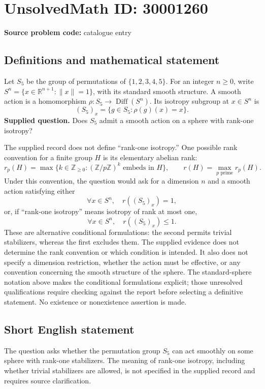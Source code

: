 \documentclass[11pt]{article}
\newcommand{\Z}{\mathbb{Z}}
\newcommand{\R}{\mathbb{R}}
\begin{document}
\section*{UnsolvedMath ID: 30001260}
\textbf{Source problem code:} catalogue entry
\subsection{Definitions and mathematical statement}
Let \(S_5\) be the group of permutations of \(\{1,2,3,4,5\}\). For an integer \(n\geq 0\), write \(S^n=\{x\in\R^{n+1}:\|x\|=1\}\), with its standard smooth structure. A smooth action is a homomorphism \(\rho:S_5\to\operatorname{Diff}(S^n)\). Its isotropy subgroup at \(x\in S^n\) is
\[
(S_5)_x=\{g\in S_5:\rho(g)(x)=x\}.
\]
\textbf{Supplied question.} Does \(S_5\) admit a smooth action on a sphere with rank-one isotropy?

The supplied record does not define ``rank-one isotropy.'' One possible rank convention for a finite group \(H\) is its elementary abelian rank:
\[
r_p(H)=\max\{k\in\Z_{\geq0}:(\Z/p\Z)^k\text{ embeds in }H\},\qquad
r(H)=\max_{p\text{ prime}}r_p(H).
\]
Under this convention, the question would ask for a dimension \(n\) and a smooth action satisfying either
\[
\forall x\in S^n,\quad r((S_5)_x)=1,
\]
or, if ``rank-one isotropy'' means isotropy of rank at most one,
\[
\forall x\in S^n,\quad r((S_5)_x)\leq1.
\]
These are alternative conditional formulations: the second permits trivial stabilizers, whereas the first excludes them. The supplied evidence does not determine the rank convention or which condition is intended. It also does not specify a dimension restriction, whether the action must be effective, or any convention concerning the smooth structure of the sphere. The standard-sphere notation above makes the conditional formulations explicit; those unresolved qualifications require checking against the report before selecting a definitive statement. No existence or nonexistence assertion is made.
\subsection{Short English statement}
The question asks whether the permutation group \(S_5\) can act smoothly on some sphere with rank-one stabilizers. The meaning of rank-one isotropy, including whether trivial stabilizers are allowed, is not specified in the supplied record and requires source clarification.
\end{document}

